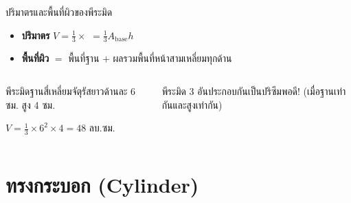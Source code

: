 \documentclass[11pt, aspectratio=169]{beamer}
\begin{document}
\begin{frame}{ปริมาตรและพื้นที่ผิวของพีระมิด}
  \begin{explanation}[สูตร]
    \begin{itemize}
      \item \textbf{ปริมาตร} $V = \frac{1}{3} \times$  $= \frac{1}{3}A_{\text{base}}h$
      \item \textbf{พื้นที่ผิว} $=$ พื้นที่ฐาน $+$ ผลรวมพื้นที่หน้าสามเหลี่ยมทุกด้าน
    \end{itemize}
  \end{explanation}

  \begin{columns}[T]
      \centering
      \medskip\medskip\medskip\medskip

      \begin{exambox}[ตัวอย่าง]
        พีระมิดฐานสี่เหลี่ยมจัตุรัสยาวด้านละ 6 ซม. สูง 4 ซม.

        $V = \frac{1}{3} \times 6^2 \times 4 = 48$ ลบ.ซม.
      \end{exambox}

      \begin{intuition}
        พีระมิด 3 อันประกอบกันเป็นปริซึมพอดี! (เมื่อฐานเท่ากันและสูงเท่ากัน)
      \end{intuition}
  \end{columns}
\end{frame}

\section{ทรงกระบอก (Cylinder)}
\end{document}
